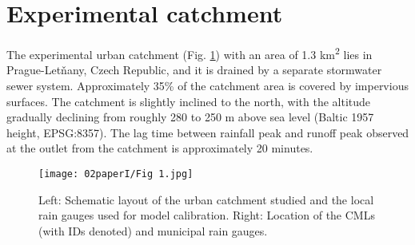 \documentclass{ctuthesis}\usepackage[]{graphicx}\usepackage[]{color}
\begin{document}
\section{Experimental catchment}

The experimental urban catchment (Fig. \ref{2fig1}) with an area of 1.3 km\textsuperscript{2} lies in Prague-Letňany, Czech Republic, and it is drained by a separate stormwater sewer system. Approximately 35\% of the catchment area is covered by impervious surfaces. The catchment is slightly inclined to the north, with the altitude gradually declining from roughly 280 to 250 m above sea level (Baltic 1957 height, EPSG:8357). The lag time between rainfall peak and runoff peak observed at the outlet from the catchment is approximately 20 minutes.


\begin{figure}[p]
\begin{center}
\texttt{[image: 02paperI/Fig 1.jpg]}
\caption{Left: Schematic layout of the urban catchment studied and the local rain gauges used for model calibration. Right: Location of the CMLs (with IDs denoted) and municipal rain gauges.} \label{2fig1}
\end{center}
\end{figure}
\end{document}
